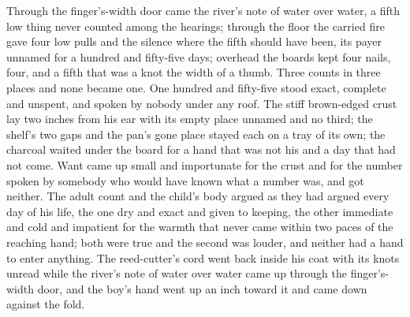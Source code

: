 Through the finger's-width door came the river's note of water over water, a fifth low thing never counted among the hearings; through the floor the carried fire gave four low pulls and the silence where the fifth should have been, its payer unnamed for a hundred and fifty-five days; overhead the boards kept four nails, four, and a fifth that was a knot the width of a thumb. Three counts in three places and none became one. One hundred and fifty-five stood exact, complete and unspent, and spoken by nobody under any roof. The stiff brown-edged crust lay two inches from his ear with its empty place unnamed and no third; the shelf's two gaps and the pan's gone place stayed each on a tray of its own; the charcoal waited under the board for a hand that was not his and a day that had not come. Want came up small and importunate for the crust and for the number spoken by somebody who would have known what a number was, and got neither. The adult count and the child's body argued as they had argued every day of his life, the one dry and exact and given to keeping, the other immediate and cold and impatient for the warmth that never came within two paces of the reaching hand; both were true and the second was louder, and neither had a hand to enter anything. The reed-cutter's cord went back inside his coat with its knots unread while the river's note of water over water came up through the finger's-width door, and the boy's hand went up an inch toward it and came down against the fold.
